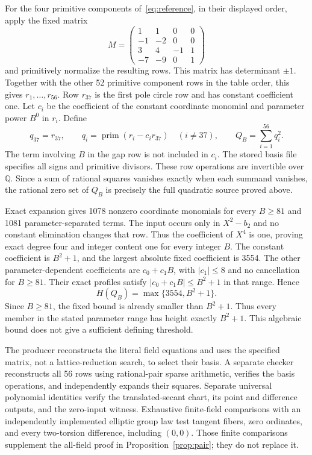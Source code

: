 \documentclass[11pt,a4paper]{article}
\newcommand{\Q}{\mathbb Q}\newcommand{\Z}{\mathbb Z}
\begin{document}
For the four primitive components of~\eqref{eq:reference}, in their
 displayed order, apply the fixed matrix
\[
 M=\begin{pmatrix}
 1&1&0&0\\
 -1&-2&0&0\\
 3&4&-1&1\\
 -7&-9&0&1
 \end{pmatrix}
\]
 and primitively normalize the resulting rows. This matrix has
 determinant $\pm1$. Together with the other 52 primitive component
 rows in the table order, this gives $r_1,\ldots,r_{56}$.
 Row $r_{37}$ is the first pole circle row and has constant
 coefficient one. Let $c_i$ be the coefficient of the constant
 coordinate monomial and parameter power $B^0$ in $r_i$. Define
\[
 q_{37}=r_{37},\qquad
 q_i=\operatorname{prim}(r_i-c_i r_{37})\quad(i\ne37),\qquad
                         Q_B=\sum_{i=1}^{56}q_i^2.
\]
 The term involving $B$ in the gap row is not included in $c_i$.
The stored basis file specifies all signs and primitive divisors.
These row operations are invertible over $\Q$. Since a sum of
rational squares vanishes exactly when each summand vanishes,
the rational zero set of $Q_B$ is precisely the full quadratic
source proved above.

Exact expansion gives 1078 nonzero coordinate monomials for every
$B\ge81$ and 1081 parameter-separated terms. The input occurs
only in $X^2-b_2$ and no constant elimination changes that row.
Thus the coefficient of $X^4$ is one, proving exact degree four
and integer content one for every integer $B$.
The constant coefficient is $B^2+1$, and the largest absolute
fixed coefficient is 3554. The other parameter-dependent
coefficients are $c_0+c_1B$, with $|c_1|\le8$ and no cancellation
for $B\ge81$. Their exact profiles satisfy
$|c_0+c_1B|\le B^2+1$ in that range. Hence
\[
                          H(Q_B)=\max\{3554,B^2+1\}.
\]
Since $B\ge81$, the fixed bound is already smaller than $B^2+1$.
Thus every member in the stated parameter range has height exactly
$B^2+1$. This algebraic bound does not give a sufficient defining
threshold.

The producer reconstructs the literal field equations and uses
the specified matrix, not a lattice-reduction search, to select
their basis. A separate checker reconstructs all 56 rows using
rational-pair sparse arithmetic, verifies the basis operations,
and independently expands their squares. Separate universal
polynomial identities verify the translated-secant chart, its point
and difference outputs, and the zero-input witness. Exhaustive
finite-field comparisons with an independently implemented elliptic
group law test tangent fibers, zero ordinates, and every two-torsion
difference, including $(0,0)$. Those finite comparisons supplement the all-field proof
in Proposition~\ref{prop:pair}; they do not replace it.
\end{document}
